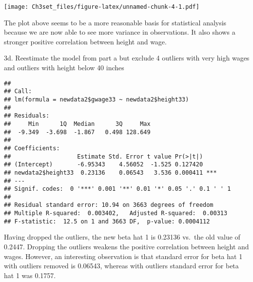 \documentclass[]{article}
\newenvironment{Shaded}{\begin{snugshade}}{\end{snugshade}}
\newcommand{\KeywordTok}[1]{\textcolor[rgb]{0.13,0.29,0.53}{\textbf{#1}}}
\newcommand{\DecValTok}[1]{\textcolor[rgb]{0.00,0.00,0.81}{#1}}
\newcommand{\StringTok}[1]{\textcolor[rgb]{0.31,0.60,0.02}{#1}}
\newcommand{\CommentTok}[1]{\textcolor[rgb]{0.56,0.35,0.01}{\textit{#1}}}
\newcommand{\OperatorTok}[1]{\textcolor[rgb]{0.81,0.36,0.00}{\textbf{#1}}}
\newcommand{\NormalTok}[1]{#1}
\begin{document}
\texttt{[image: Ch3set\_files/figure-latex/unnamed-chunk-4-1.pdf]}

The plot above seems to be a more reasonable basis for statistical
analysis because we are now able to see more variance in observations.
It also shows a stronger positive correlation between height and wage.

3d. Reestimate the model from part a but exclude 4 outliers with very
high wages and outliers with height below 40 inches

\begin{Shaded}
\end{Shaded}

\begin{verbatim}
## 
## Call:
## lm(formula = newdata2$gwage33 ~ newdata2$height33)
## 
## Residuals:
##     Min      1Q  Median      3Q     Max 
##  -9.349  -3.698  -1.867   0.498 128.649 
## 
## Coefficients:
##                   Estimate Std. Error t value Pr(>|t|)    
## (Intercept)       -6.95343    4.56052  -1.525 0.127420    
## newdata2$height33  0.23136    0.06543   3.536 0.000411 ***
## ---
## Signif. codes:  0 '***' 0.001 '**' 0.01 '*' 0.05 '.' 0.1 ' ' 1
## 
## Residual standard error: 10.94 on 3663 degrees of freedom
## Multiple R-squared:  0.003402,   Adjusted R-squared:  0.00313 
## F-statistic:  12.5 on 1 and 3663 DF,  p-value: 0.0004112
\end{verbatim}

Having dropped the outliers, the new beta hat 1 is 0.23136 vs.~the old
value of 0.2447. Dropping the outliers weakens the positive correlation
between height and wages. However, an interesting observation is that
standard error for beta hat 1 with outliers removed is 0.06543, whereas
with outliers standard error for beta hat 1 was 0.1757.
\end{document}
